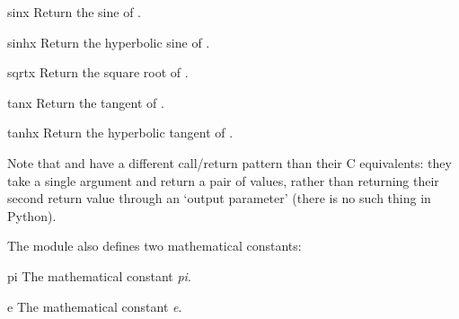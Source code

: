\begin{funcdesc}{sin}{x}
Return the sine of .
\end{funcdesc}

\begin{funcdesc}{sinh}{x}
Return the hyperbolic sine of .
\end{funcdesc}

\begin{funcdesc}{sqrt}{x}
Return the square root of .
\end{funcdesc}

\begin{funcdesc}{tan}{x}
Return the tangent of .
\end{funcdesc}

\begin{funcdesc}{tanh}{x}
Return the hyperbolic tangent of .
\end{funcdesc}

Note that  and  have a different
call/return pattern than their C equivalents: they take a single
argument and return a pair of values, rather than returning their
second return value through an `output parameter' (there is no such
thing in Python).

The module also defines two mathematical constants:

\begin{datadesc}{pi}
The mathematical constant \emph{pi}.
\end{datadesc}

\begin{datadesc}{e}
The mathematical constant \emph{e}.
\end{datadesc}

\begin{seealso}
\end{seealso}
